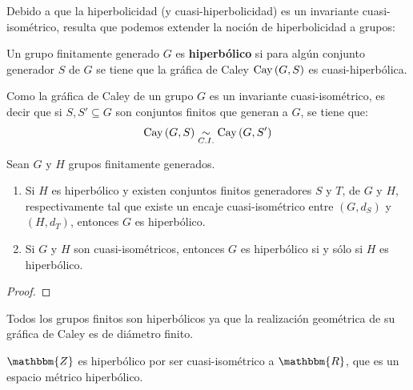 \documentclass[12pt]{report}
\theoremstyle{largebreak}
\newcommand{\bbm}[1]{\ensuremath{\mathbbm{#1}}}
\newcommand{\Cay}[1]{\ensuremath{\textup{Cay}\left(#1\right)}}
\newcommand{\qisom}{\ensuremath{\underset{C.I.}{\sim}}}
\begin{document}
    Debido a que la hiperbolicidad (y cuasi-hiperbolicidad) es un invariante cuasi-isométrico, resulta que podemos extender la noción de hiperbolicidad a grupos:

    \begin{mydef}
        Un grupo finitamente generado $G$ es \textbf{hiperbólico} si para algún conjunto generador $S$ de $G$ se tiene que la gráfica de Caley $\Cay{G,S}$ es cuasi-hiperbólica.
    \end{mydef}

    \begin{obs}
        Como la gráfica de Caley de un grupo $G$ es un invariante cuasi-isométrico, es decir que si $S,S'\subseteq G$ son conjuntos finitos que generan a $G$, se tiene que:
        \begin{equation*}
            \Cay{G,S}\qisom\Cay{G,S'}
        \end{equation*}
    \end{obs}

    \begin{propo}
        Sean $G$ y $H$ grupos finitamente generados.
        \begin{enumerate}[label = \textit{(\arabic*)}]
            \item Si $H$ es hiperbólico y existen conjuntos finitos generadores $S$ y $T$, de $G$ y $H$, respectivamente tal que existe un encaje cuasi-isométrico entre $(G,d_S)$ y $(H,d_T)$, entonces $G$ es hiperbólico.
            \item Si $G$ y $H$ son cuasi-isométricos, entonces $G$ es hiperbólico si y sólo si $H$ es hiperbólico.
        \end{enumerate}
    \end{propo}

    \begin{proof}
    \end{proof}

    \begin{exa}
        Todos los grupos finitos son hiperbólicos ya que la realización geométrica de su gráfica de Caley es de diámetro finito.
    \end{exa}

    \begin{exa}
        $\bbm{Z}$ es hiperbólico por ser cuasi-isométrico a $\bbm{R}$, que es un espacio métrico hiperbólico.
    \end{exa}
\end{document}

